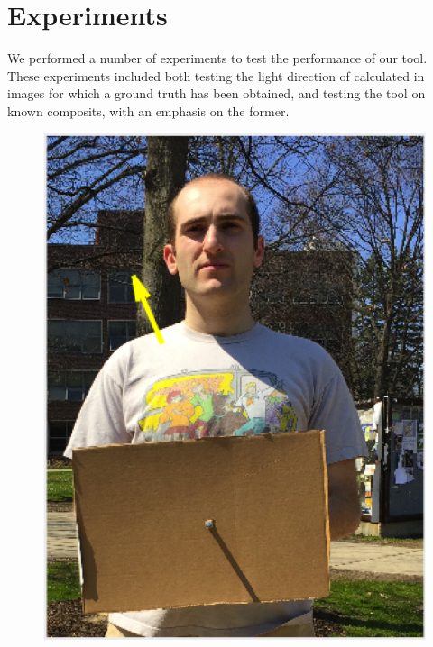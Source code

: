\documentclass[10pt,twocolumn,letterpaper]{article}
\begin{document}
\section{Experiments}
We performed a number of experiments to test the performance of our tool. These experiments included both testing the light direction of calculated in images for which a ground truth has been obtained, and testing the tool on known composits, with an emphasis on the former.

\begin{figure}[h]
\center
\includegraphics[scale = 0.3]{nathan.png}

\end{figure}
\end{document}
